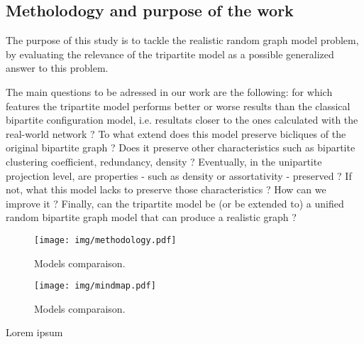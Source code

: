 \documentclass[table]{report}
\begin{document}
\subsection{Metholodogy and purpose of the work}

The purpose of this study is to tackle the realistic random graph model problem, by evaluating the relevance of the tripartite model as a possible generalized answer to this problem.

The main questions to be adressed in our work are the following: for which features the tripartite model performs better or worse results than the classical bipartite configuration model, i.e. resultats closer to the ones calculated with the real-world network ? To what extend does this model preserve bicliques of the original bipartite graph ? Does it preserve other characteristics such as bipartite clustering coefficient, redundancy, density ? Eventually, in the unipartite projection level, are properties  - such as density or assortativity - preserved ? If not, what this model lacks to preserve those characteristics ? How can we improve it ? Finally, can the tripartite model be (or be extended to) a unified random bipartite graph model that can produce a realistic graph ?


\begin{figure}[h]%
\centering
\texttt{[image: img/methodology.pdf]}
\caption{Models comparaison.}
\label{fig:methodology}
\end{figure}
\FloatBarrier




\begin{figure}[h]%
\centering
\texttt{[image: img/mindmap.pdf]}
\caption{Models comparaison.}
\label{fig:mindmap}
\end{figure}
\FloatBarrier

Lorem ipsum



%
%
%
%
%
\end{document}
